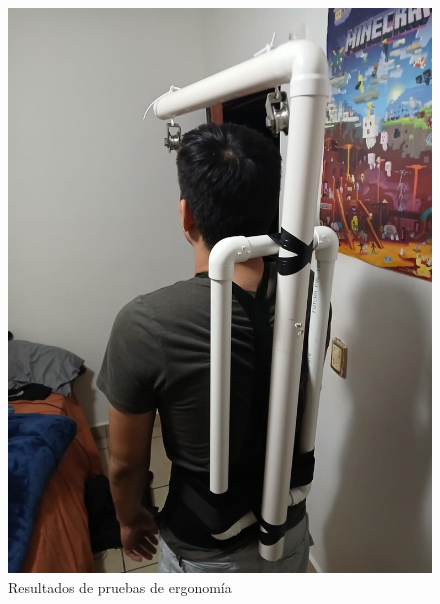\begin{figure}[H]
    \centering
    \includegraphics[width=1\textwidth, height=.9\textheight]{img/PruebaErgonomica4.png}
    \caption{Resultados de pruebas de ergonomía}
    \label{fig:ergo-test4}
\end{figure}

